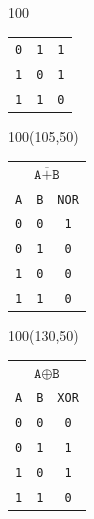 \documentclass[aspectratio=169]{beamer}
\begin{document}
\begin{frame}[fragile,t]
\begin{textblock}{100}
\begin{tabular}{cc|c}
    \texttt{0} & \texttt{1} & \texttt{1} \\
    \texttt{1} & \texttt{0} & \texttt{1} \\
    \texttt{1} & \texttt{1} & \texttt{0} \\
    \end{tabular}
    \end{textblock}
    \begin{textblock}{100}(105,50)
    \begin{tabular}{cc|c}
    \multicolumn{3}{c}{\textcolor{naranjauca}{ $\overline{\texttt{A}+\texttt{B}}$ } } \\
    \texttt{A} & \texttt{B} & \texttt{NOR} \\
    \hline
    \texttt{0} & \texttt{0} & \texttt{1} \\
    \texttt{0} & \texttt{1} & \texttt{0} \\
    \texttt{1} & \texttt{0} & \texttt{0} \\
    \texttt{1} & \texttt{1} & \texttt{0} \\
    \end{tabular}
    \end{textblock}
    \begin{textblock}{100}(130,50)
    \begin{tabular}{cc|c}
    \multicolumn{3}{c}{\textcolor{naranjauca}{ $\texttt{A}\oplus\texttt{B}$ } } \\
    \texttt{A} & \texttt{B} & \texttt{XOR} \\
    \hline
    \texttt{0} & \texttt{0} & \texttt{0} \\
    \texttt{0} & \texttt{1} & \texttt{1} \\
    \texttt{1} & \texttt{0} & \texttt{1} \\
    \texttt{1} & \texttt{1} & \texttt{0} \\
    \end{tabular}
    \end{textblock}
\end{frame}
\end{document}
